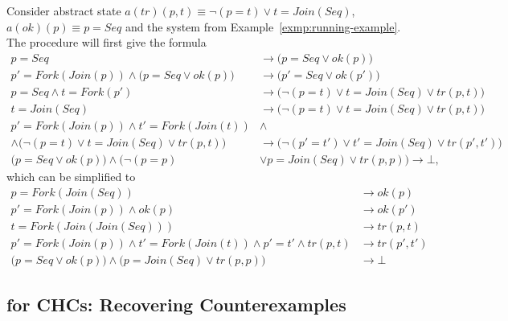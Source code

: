 \begin{example}
Consider abstract state $a(tr)(p, t) \equiv \neg(p = t) \lor t = Join(Seq)$, $a(ok)(p) \equiv p = Seq$ and the system from Example~\ref{exmp:running-example}. The procedure \substituteLemmas{} will first give the formula
\begin{align*}
  p = Seq &\rightarrow\big(p = Seq \lor ok(p)\big)&\\
  p' = Fork(Join(p)) \land \big(p = Seq \lor ok(p)\big) &\rightarrow\big(p' = Seq \lor ok(p')\big)&\\
  p = Seq \land t = Fork(p') &\rightarrow\big(\neg(p = t) \lor t = Join(Seq) \lor tr(p, t)\big)&\\
  t = Join(Seq) &\rightarrow\big(\neg(p = t) \lor t = Join(Seq) \lor tr(p, t)\big)&\\
  p' = Fork(Join(p)) \land t' = Fork(Join(t)) &\land&\\
  \land\big(\neg(p = t) \lor t = Join(Seq) \lor tr(p, t)\big)
  &\rightarrow\big(\neg(p' = t') \lor t' = Join(Seq) \lor tr(p', t')\big)&\\
  \big(p = Seq \lor ok(p)\big) \land \big(\neg(p = p)  &\lor p = Join(Seq) \lor tr(p, p)\big) \rightarrow \bot,
  \end{align*}
which can be simplified to
\begin{align*}
  p = Fork(Join(Seq)) &\rightarrow ok(p)\\
  p' = Fork(Join(p)) \land ok(p) &\rightarrow ok(p')\\
  t = Fork(Join(Join(Seq))) &\rightarrow tr(p, t)\\
  p' = Fork(Join(p)) \land t' = Fork(Join(t)) \land p' = t'\land tr(p, t) &\rightarrow tr(p', t')\\
  \big(p = Seq \lor ok(p)\big) \land \big(p = Join(Seq) \lor tr(p, p)\big) &\rightarrow \bot
  \end{align*}
\end{example}

\subsection{\ourCEGAR{} for CHCs: Recovering Counterexamples}\label{sec:recover-cex}


